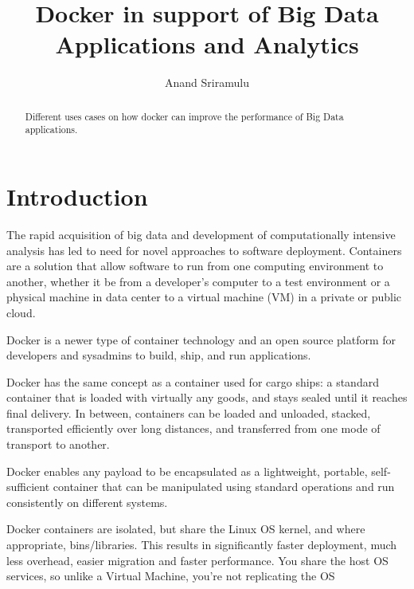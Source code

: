 \documentclass[sigconf]{acmart}
\begin{document}
	\title {Docker in support of Big Data Applications and Analytics}
	
	
	\author{Anand Sriramulu}
	
	
	\renewcommand{\shortauthors}{Anand S}
	
	
	\begin{abstract}
		Different uses cases on how docker can improve the performance of Big Data applications.
	\end{abstract}
	
	
	\maketitle
	
	\section{Introduction}
	The rapid acquisition of big data and development of computationally intensive analysis has led to need for novel approaches to software deployment. Containers are a solution that allow software to run from one computing environment to another, whether it be from a developer's computer to a test environment or a physical machine in data center to a virtual machine (VM) in a private or public cloud.  
	
	Docker is a newer type of container technology and an open source platform for developers and sysadmins to build, ship, and run applications.
	
	Docker has the same concept as a container used for cargo ships: a standard container that is loaded with virtually any goods, and stays sealed until it reaches final delivery. In between, containers can be loaded and unloaded, stacked, transported efficiently over long distances, and transferred from one mode of transport to another. \cite{About_Docker}
	
	Docker enables any payload to be encapsulated as a lightweight, portable, self-sufficient container that can be manipulated using standard operations and run consistently on different systems.
	
	Docker containers are isolated, but share the Linux OS kernel, and where appropriate, bins/libraries. This results in significantly faster deployment, much less overhead, easier migration and faster performance. You share the host OS services, so unlike a Virtual Machine, you're not replicating the OS
	
\end{document}
